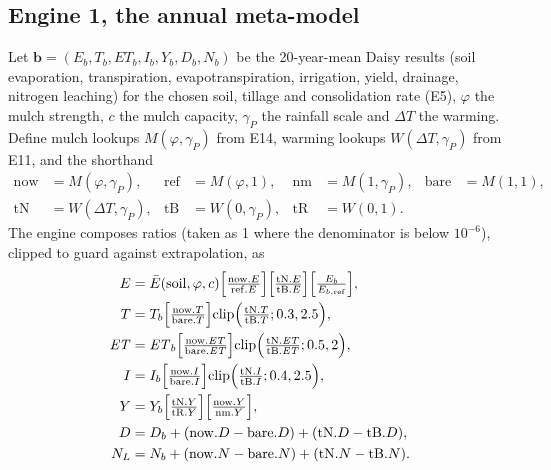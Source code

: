 \subsection{Engine 1, the annual meta-model}
Let $\mathbf b=(E_b,T_b,\mathit{ET}_b,I_b,Y_b,D_b,N_b)$ be the 20-year-mean Daisy results (soil evaporation, transpiration, evapotranspiration, irrigation, yield, drainage, nitrogen leaching) for the chosen soil, tillage and consolidation rate (E5), $\varphi$ the mulch strength, $c$ the mulch capacity, $\gamma_P$ the rainfall scale and $\Delta T$ the warming. Define mulch lookups $M(\varphi,\gamma_P)$ from E14, warming lookups $W(\Delta T,\gamma_P)$ from E11, and the shorthand
\begin{equation}
\begin{aligned}\mathrm{now}&=M(\varphi,\gamma_P),& \mathrm{ref}&=M(\varphi,1),& \mathrm{nm}&=M(1,\gamma_P),& \mathrm{bare}&=M(1,1),\\ \mathrm{tN}&=W(\Delta T,\gamma_P),& \mathrm{tB}&=W(0,\gamma_P),& \mathrm{tR}&=W(0,1).\end{aligned}
\end{equation}
The engine composes ratios (taken as 1 where the denominator is below $10^{-6}$), clipped to guard against extrapolation, as
\begin{align}
E&=\bar E(\mathrm{soil},\varphi,c)\Bigl[\tfrac{\mathrm{now}.E}{\mathrm{ref}.E}\Bigr]\Bigl[\tfrac{\mathrm{tN}.E}{\mathrm{tB}.E}\Bigr]\Bigl[\tfrac{E_b}{E_{b,\mathrm{ref}}}\Bigr],\label{eq:E1E}\\
T&=T_b\Bigl[\tfrac{\mathrm{now}.T}{\mathrm{bare}.T}\Bigr]\mathrm{clip}\Bigl(\tfrac{\mathrm{tN}.T}{\mathrm{tB}.T};0.3,2.5\Bigr),\label{eq:E1T}\\
\mathit{ET}&=\mathit{ET}_b\Bigl[\tfrac{\mathrm{now}.\mathit{ET}}{\mathrm{bare}.\mathit{ET}}\Bigr]\mathrm{clip}\Bigl(\tfrac{\mathrm{tN}.\mathit{ET}}{\mathrm{tB}.\mathit{ET}};0.5,2\Bigr),\label{eq:E1ET}\\
I&=I_b\Bigl[\tfrac{\mathrm{now}.I}{\mathrm{bare}.I}\Bigr]\mathrm{clip}\Bigl(\tfrac{\mathrm{tN}.I}{\mathrm{tB}.I};0.4,2.5\Bigr),\label{eq:E1I}\\
Y&=Y_b\Bigl[\tfrac{\mathrm{tN}.Y}{\mathrm{tR}.Y}\Bigr]\Bigl[\tfrac{\mathrm{now}.Y}{\mathrm{nm}.Y}\Bigr],\label{eq:E1Y}\\
D&=D_b+(\mathrm{now}.D-\mathrm{bare}.D)+(\mathrm{tN}.D-\mathrm{tB}.D),\label{eq:E1D}\\
N_L&=N_b+(\mathrm{now}.N-\mathrm{bare}.N)+(\mathrm{tN}.N-\mathrm{tB}.N).\label{eq:E1N}
\end{align}
